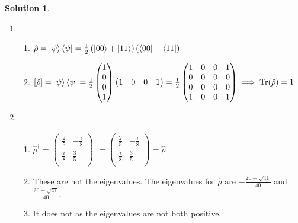 \documentclass[10pt]{article}
\theoremstyle{definition}
\newtheorem{soln}{Solution}
\begin{document}
\begin{soln}
\begin{enumerate}[label=(\alph*)]
    \item \begin{enumerate}[label=(\Alph*)]
            \item $\hat{\rho}=\ket{\psi}\bra{\psi}=\frac{1}{2}\left(\ket{00}+\ket{11}\right)
                    \left(\bra{00}+\bra{11}\right)$
            \item $\left[\hat{\rho}\right]=\ket{\psi}\bra{\psi}=\frac{1}{2}\begin{pmatrix}
                      1 \\
                      0 \\
                      0 \\
                      1
                    \end{pmatrix}\begin{pmatrix}
                      1 & 0 & 0 & 1
                    \end{pmatrix}=
                    \frac{1}{2}\begin{pmatrix}
                      1 & 0 & 0 & 1 \\
                      0 & 0 & 0 & 0 \\
                      0 & 0 & 0 & 0 \\
                      1 & 0 & 0 & 1
                    \end{pmatrix}\implies\mathrm{Tr}(\hat{\rho})=1$
          \end{enumerate}
    \item \begin{enumerate}[label=(\Alph*)]
            \item $\hat{\rho}^\dagger=\begin{pmatrix}
                      \frac{2}{5} & -\frac{i}{8} \\
                      \frac{i}{8} & \frac{3}{5}  \\
                    \end{pmatrix}^\dagger=\begin{pmatrix}
                      \frac{2}{5} & -\frac{i}{8} \\
                      \frac{i}{8} & \frac{3}{5}  \\
                    \end{pmatrix}=\hat{\rho}$
            \item These are not the eigenvalues. The eigenvalues for $\hat{\rho}$ are $-\frac{20+\sqrt{41}}{40}$ and $\frac{20+\sqrt{41}}{40}$.
            \item It does not as the eigenvalues are not both positive.

\end{enumerate}
\end{enumerate}
\end{soln}
\end{document}

